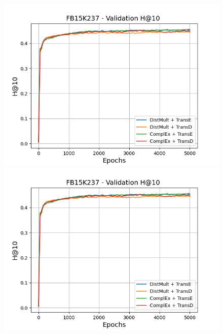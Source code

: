 \begin{figure}
    \begin{minipage}{.3\textwidth}
      \centering
      \includegraphics[width=\linewidth]{figures/results/gan_train/not_pretrained/random/fb15k237/epochs5000/random_fb15k237_hit10.png}
    \end{minipage}%
     \begin{minipage}{.3\textwidth}
      \centering
      \includegraphics[width=\linewidth]{figures/results/gan_train/not_pretrained/random/fb15k237/epochs5000/random_fb15k237_hit10.png}
    \end{minipage}%
     \begin{minipage}{.3\textwidth}
      \centering

\end{minipage}
\end{figure}
